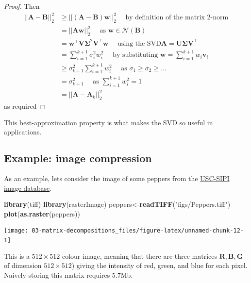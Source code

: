 \documentclass[]{book}
\newenvironment{Shaded}{\begin{snugshade}}{\end{snugshade}}
\newcommand{\KeywordTok}[1]{\textcolor[rgb]{0.13,0.29,0.53}{\textbf{#1}}}
\newcommand{\NormalTok}[1]{#1}
\newcommand{\StringTok}[1]{\textcolor[rgb]{0.31,0.60,0.02}{#1}}
\theoremstyle{definition}
\theoremstyle{definition}
\theoremstyle{definition}
\theoremstyle{remark}
\begin{document}
\begin{proof}
Then
\begin{align*}
||\boldsymbol A-\boldsymbol B||_2^2 &\geq ||(\boldsymbol A-\boldsymbol B)\boldsymbol w||_{2}^2 \quad \mbox{ by definition of the matrix 2-norm}\\
&=||\boldsymbol A\boldsymbol w||_2^2 \quad \mbox{ as } \boldsymbol w\in \mathcal{N}(\boldsymbol B)\\
&=\boldsymbol w^\top \boldsymbol V\boldsymbol \Sigma^2\boldsymbol V^\top \boldsymbol w\quad\mbox{ using the SVD} \boldsymbol A=\boldsymbol U\boldsymbol \Sigma\boldsymbol V^\top\\
&=\sum_{i=1}^{k+1}\sigma_i^2 w_i^2 \quad\mbox{ by substituting }\boldsymbol w= \sum_{i=1}^{k+1}w_i \boldsymbol v_i\\
&\geq \sigma_{k+1}^2 \sum_{i=1}^{k+1} w_i^2\quad\mbox{ as } \sigma_1\geq\sigma_2\geq\ldots\\
&= \sigma_{k+1}^2 \quad\mbox{ as } \sum_{i=1}^{k+1}w_i^2=1\\
&=||\boldsymbol A-\boldsymbol A_k||_2^2
\end{align*}
as required
\end{proof}

This best-approximation property is what makes the SVD so useful in applications.

\hypertarget{example-image-compression}{%
\subsection{Example: image compression}\label{example-image-compression}}

As an example, lets consider the image of some peppers from the \href{http://sipi.usc.edu/database/}{USC-SIPI image database}.

\begin{Shaded}
\begin{Highlighting}[]
\KeywordTok{library}\NormalTok{(tiff)}
\KeywordTok{library}\NormalTok{(rasterImage)}
\NormalTok{peppers<-}\KeywordTok{readTIFF}\NormalTok{(}\StringTok{"figs/Peppers.tiff"}\NormalTok{)}
\KeywordTok{plot}\NormalTok{(}\KeywordTok{as.raster}\NormalTok{(peppers))}
\end{Highlighting}
\end{Shaded}

\texttt{[image: 03-matrix-decompositions\_files/figure-latex/unnamed-chunk-12-1]}

This is a \(512 \times 512\) colour image, meaning that there are three matrices \(\boldsymbol R, \boldsymbol B,\boldsymbol G\) of dimension \(512\times 512\)) giving the intensity of red, green, and blue for each pixel.
Naively storing this matrix requires 5.7Mb.
\end{document}
